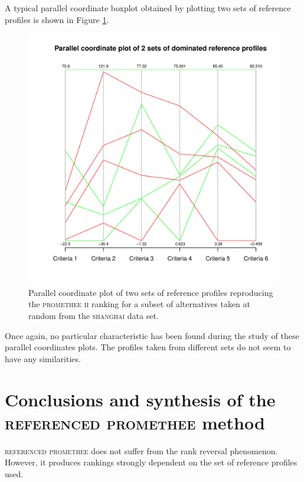 A typical parallel coordinate boxplot obtained by plotting two sets of reference profiles is shown in Figure \ref{fig:parallel_coordinate_sha}.

\begin{figure}[h]
\centering
\includegraphics[width=\textwidth]{referenced_promethee/src/parallel_coordinate_plot_sha_seed_0_RS_1_2.pdf}
    \caption{Parallel coordinate plot of two sets of reference profiles reproducing the \textsc{promethee ii} ranking for a subset of alternatives taken at random from the \textsc{shanghai} data set.}
    \label{fig:parallel_coordinate_sha}
\end{figure}

Once again, no particular characteristic has been found during the study of these parallel coordinates plots. The profiles taken from different sets do not seem to have any similarities.

\section{Conclusions and synthesis of the \\ \textsc{referenced promethee} method}

\textsc{referenced promethee} does not suffer from the rank reversal phenomenon.
However, it produces rankings strongly dependent on the set of reference profiles used.

